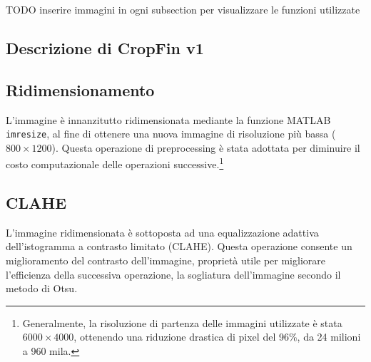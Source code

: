 TODO inserire immagini in ogni subsection per visualizzare le funzioni utilizzate

\subsection{Descrizione di CropFin v1}
\subsection*{Ridimensionamento}
L'immagine è innanzitutto ridimensionata mediante la funzione MATLAB \verb|imresize|, al fine di ottenere una nuova immagine di risoluzione più bassa ($800\times 1200$).
Questa operazione di preprocessing è stata adottata per diminuire il costo computazionale delle operazioni successive.\footnote{Generalmente, la risoluzione di partenza delle immagini utilizzate è stata $6000\times 4000$, ottenendo una riduzione drastica di pixel del 96\%, da 24 milioni a 960 mila.}


\subsection*{CLAHE}
L'immagine ridimensionata è sottoposta ad una equalizzazione adattiva dell’istogramma a contrasto limitato (CLAHE). Questa operazione consente un miglioramento del contrasto dell'immagine, proprietà utile per migliorare l'efficienza della successiva operazione, la sogliatura dell'immagine secondo il metodo di Otsu.

